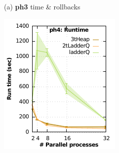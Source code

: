 \begin{figure}
\begin{minipage}{0.5\linewidth}
\begin{minipage}{0.49\linewidth}
\end{minipage}
\centerline{(a) \textbf{ph3} time \& rollbacks}
\end{minipage}
\begin{minipage}{0.5\linewidth}
\begin{minipage}{0.49\linewidth}
\includegraphics[width=\linewidth]{images/ph4_Delay_10_Evt_10_run_time}
\end{minipage}
\begin{minipage}{0.49\linewidth}

\end{minipage}
\end{minipage}
\end{figure}
